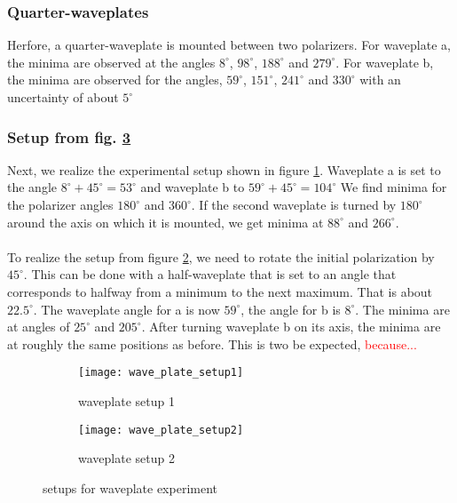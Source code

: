 \subsubsection{Quarter-waveplates}
Herfore, a quarter-waveplate is mounted between two polarizers.
For waveplate a, the minima are observed at the angles $8^\circ$,
$98^\circ$, $188^\circ$ and $279^\circ$. For waveplate b,
the minima are observed for the angles, $59^\circ$,
$151^\circ$, $241^\circ$ and $330^\circ$ with an uncertainty of
about $5^\circ$

\subsubsection{Setup from fig. \ref{wave_plate_setup}}
Next, we realize the experimental setup shown in figure
\ref{wave_plate_setup1}. Waveplate a is set to the angle
$8^\circ+45^\circ=53^\circ$ and waveplate b to $59^\circ+45^\circ=104^\circ$
We find minima for the polarizer angles $180^\circ$ and $360^\circ$.
If the second waveplate is turned by $180^\circ$ around the axis on
which it is mounted, we get minima at $88^\circ$ and $266^\circ$. \\ \\
To realize the setup from figure \ref{wave_plate_setup2}, we need to
rotate the initial polarization by $45^\circ$. This can be done with a
half-waveplate that is set to an angle that corresponds to halfway from
a minimum to the next maximum. That is about $22.5^\circ$.
The waveplate angle for a is now $59^\circ$, the angle for b is $8^\circ$.
The minima are at angles of $25^\circ$ and $205^\circ$.
After turning waveplate b on its axis, the minima are at roughly the same
positions as before. This is two be expected, \textcolor{red}{because...}
\begin{figure}[h!]
    \centering
    \begin{subfigure}{.5\textwidth}
        \centering
        \texttt{[image: wave\_plate\_setup1]}
        \caption{waveplate setup 1}
        \label{wave_plate_setup1}
    \end{subfigure}%
    \begin{subfigure}{.5\textwidth}
        \centering
        \texttt{[image: wave\_plate\_setup2]}
        \caption{waveplate setup 2}
        \label{wave_plate_setup2}
    \end{subfigure}
    \caption{setups for waveplate experiment}
    \label{wave_plate_setup}
\end{figure}

